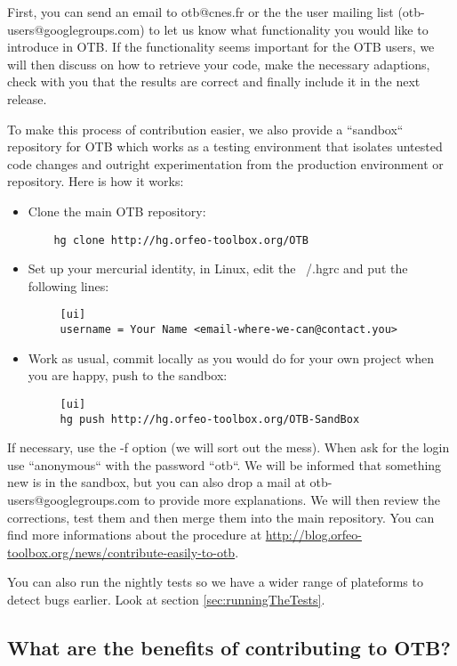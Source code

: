 First, you can send an email to otb@cnes.fr or the the user mailing list (otb-users@googlegroups.com)
to let us know what functionality
you would like to introduce in OTB. If the functionality seems important for the
OTB users, we will then discuss on how to retrieve your code,
make the necessary adaptions, check with you that the results are correct and finally
include it in the next release.

To make this process of contribution easier, we also provide a
``sandbox`` repository for OTB which works as a testing environment that
isolates untested code changes and outright experimentation from the
production environment or repository. Here is how it works:

\begin{itemize}
  \item Clone the main OTB repository:
    \begin{verbatim}
    hg clone http://hg.orfeo-toolbox.org/OTB
    \end{verbatim}
  \item Set up your mercurial identity, in Linux, edit the ~/.hgrc and put the following lines:
    \begin{verbatim}
     [ui]
     username = Your Name <email-where-we-can@contact.you>
    \end{verbatim}
  \item Work as usual, commit locally as you would do for your own project
    when you are happy, push to the sandbox:
    \begin{verbatim}
     [ui]
     hg push http://hg.orfeo-toolbox.org/OTB-SandBox
    \end{verbatim}
\end{itemize}

If necessary, use the -f option (we will sort out the mess). When ask
for the login use ``anonymous`` with the password ``otb``.  We will be
informed that something new is in the sandbox, but you can also drop a
mail at otb-users@googlegroups.com to provide more explanations.
We will then review the corrections, test them and then merge them
into the main repository.  You can find more informations about the
procedure at
\url{http://blog.orfeo-toolbox.org/news/contribute-easily-to-otb}.

You can also run the nightly tests so we have a wider range of plateforms to detect
bugs earlier. Look at section \ref{sec:runningTheTests}.

\subsection{What are the benefits of contributing to OTB?}

